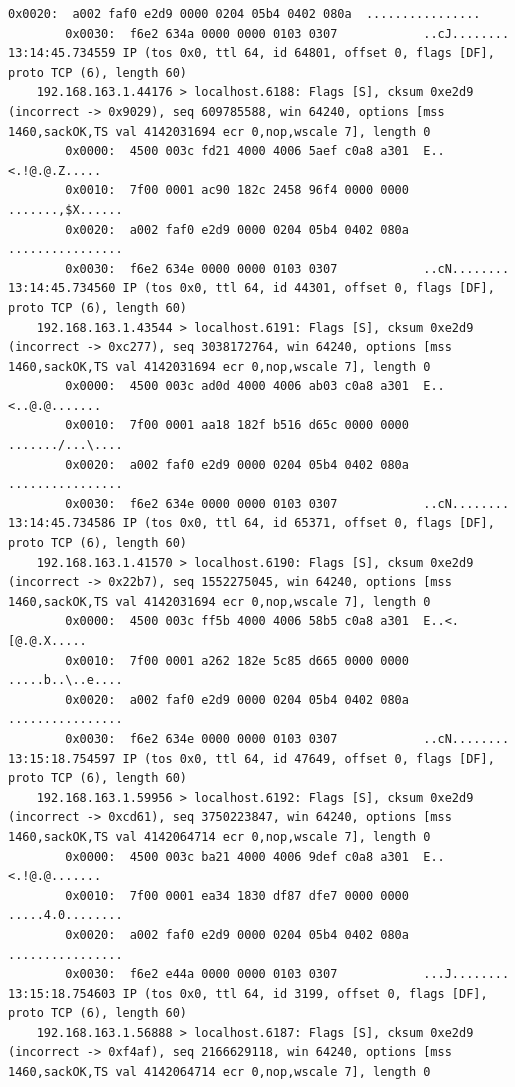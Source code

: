 \documentclass[11pt, a4paper]{article}
\begin{document}
\begin{Verbatim}[fontsize=\footnotesize]
        0x0020:  a002 faf0 e2d9 0000 0204 05b4 0402 080a  ................
        0x0030:  f6e2 634a 0000 0000 0103 0307            ..cJ........
13:14:45.734559 IP (tos 0x0, ttl 64, id 64801, offset 0, flags [DF], proto TCP (6), length 60)
    192.168.163.1.44176 > localhost.6188: Flags [S], cksum 0xe2d9 (incorrect -> 0x9029), seq 609785588, win 64240, options [mss 1460,sackOK,TS val 4142031694 ecr 0,nop,wscale 7], length 0
        0x0000:  4500 003c fd21 4000 4006 5aef c0a8 a301  E..<.!@.@.Z.....
        0x0010:  7f00 0001 ac90 182c 2458 96f4 0000 0000  .......,$X......
        0x0020:  a002 faf0 e2d9 0000 0204 05b4 0402 080a  ................
        0x0030:  f6e2 634e 0000 0000 0103 0307            ..cN........
13:14:45.734560 IP (tos 0x0, ttl 64, id 44301, offset 0, flags [DF], proto TCP (6), length 60)
    192.168.163.1.43544 > localhost.6191: Flags [S], cksum 0xe2d9 (incorrect -> 0xc277), seq 3038172764, win 64240, options [mss 1460,sackOK,TS val 4142031694 ecr 0,nop,wscale 7], length 0
        0x0000:  4500 003c ad0d 4000 4006 ab03 c0a8 a301  E..<..@.@.......
        0x0010:  7f00 0001 aa18 182f b516 d65c 0000 0000  ......./...\....
        0x0020:  a002 faf0 e2d9 0000 0204 05b4 0402 080a  ................
        0x0030:  f6e2 634e 0000 0000 0103 0307            ..cN........
13:14:45.734586 IP (tos 0x0, ttl 64, id 65371, offset 0, flags [DF], proto TCP (6), length 60)
    192.168.163.1.41570 > localhost.6190: Flags [S], cksum 0xe2d9 (incorrect -> 0x22b7), seq 1552275045, win 64240, options [mss 1460,sackOK,TS val 4142031694 ecr 0,nop,wscale 7], length 0
        0x0000:  4500 003c ff5b 4000 4006 58b5 c0a8 a301  E..<.[@.@.X.....
        0x0010:  7f00 0001 a262 182e 5c85 d665 0000 0000  .....b..\..e....
        0x0020:  a002 faf0 e2d9 0000 0204 05b4 0402 080a  ................
        0x0030:  f6e2 634e 0000 0000 0103 0307            ..cN........
13:15:18.754597 IP (tos 0x0, ttl 64, id 47649, offset 0, flags [DF], proto TCP (6), length 60)
    192.168.163.1.59956 > localhost.6192: Flags [S], cksum 0xe2d9 (incorrect -> 0xcd61), seq 3750223847, win 64240, options [mss 1460,sackOK,TS val 4142064714 ecr 0,nop,wscale 7], length 0
        0x0000:  4500 003c ba21 4000 4006 9def c0a8 a301  E..<.!@.@.......
        0x0010:  7f00 0001 ea34 1830 df87 dfe7 0000 0000  .....4.0........
        0x0020:  a002 faf0 e2d9 0000 0204 05b4 0402 080a  ................
        0x0030:  f6e2 e44a 0000 0000 0103 0307            ...J........
13:15:18.754603 IP (tos 0x0, ttl 64, id 3199, offset 0, flags [DF], proto TCP (6), length 60)
    192.168.163.1.56888 > localhost.6187: Flags [S], cksum 0xe2d9 (incorrect -> 0xf4af), seq 2166629118, win 64240, options [mss 1460,sackOK,TS val 4142064714 ecr 0,nop,wscale 7], length 0

\end{Verbatim}
\end{document}
